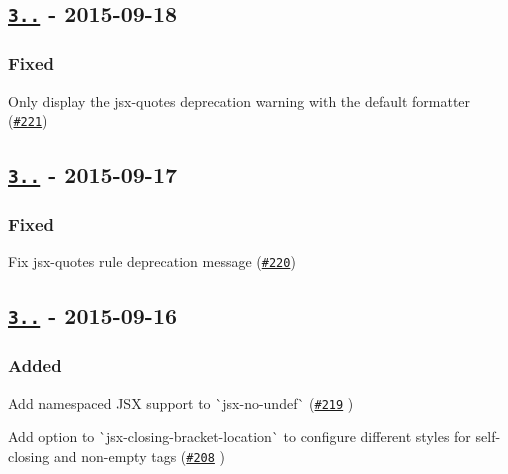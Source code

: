 \subsection*{\href{https://github.com/yannickcr/eslint-plugin-react/compare/v3.4.1...v3.4.2}{\tt 3..} -\/ 2015-\/09-\/18}

\subsubsection*{Fixed}


\begin{DoxyItemize}
\item Only display the {\ttfamily jsx-\/quotes} deprecation warning with the default formatter (\href{https://github.com/yannickcr/eslint-plugin-react/issues/221}{\tt \#221})
\end{DoxyItemize}

\subsection*{\href{https://github.com/yannickcr/eslint-plugin-react/compare/v3.4.0...v3.4.1}{\tt 3..} -\/ 2015-\/09-\/17}

\subsubsection*{Fixed}


\begin{DoxyItemize}
\item Fix {\ttfamily jsx-\/quotes} rule deprecation message (\href{https://github.com/yannickcr/eslint-plugin-react/issues/220}{\tt \#220})
\end{DoxyItemize}

\subsection*{\href{https://github.com/yannickcr/eslint-plugin-react/compare/v3.3.2...v3.4.0}{\tt 3..} -\/ 2015-\/09-\/16}

\subsubsection*{Added}


\begin{DoxyItemize}
\item Add namespaced J\+SX support to \`{}jsx-\/no-\/undef\`{} (\href{https://github.com/yannickcr/eslint-plugin-react/pull/219}{\tt \#219} )
\item Add option to \`{}jsx-\/closing-\/bracket-\/location\`{} to configure different styles for self-\/closing and non-\/empty tags (\href{https://github.com/yannickcr/eslint-plugin-react/pull/208}{\tt \#208} )
\end{DoxyItemize}

